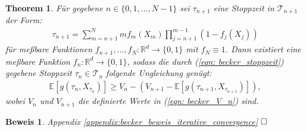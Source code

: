 \documentclass[12pt,titlepage,headsepline]{article}
\newtheorem{theorem}{Theorem}[section]
\newtheorem*{beweis-non}{Beweis}
\begin{document}
      \begin{theorem}\label{theorem: becker_stoppzeit_opt}
        Für gegebene $n \in \{0,1,\ldots,N-1\}$ sei $\tau_{n+1}$ eine Stoppzeit in $\mathcal{T}_{n+1}$ der Form:
        \begin{align*}
          \tau_{n+1} = \sum_{m={n+1}}^N mf_m(X_m)\prod_{j={n+1}}^{m-1}(1-f_j(X_j))
        \end{align*}
        für meßbare Funktionen $f_{n+1},\ldots,f_N:\mathbb{R}^d \rightarrow \{0,1\}$ mit $f_N \equiv 1$. Dann existiert eine meßbare Funktion $f_n: \mathbb{R}^d \rightarrow \{0,1\}$, sodass die durch (\ref{eqn: becker_stoppzeit}) gegebene Stoppzeit $\tau_n \in \mathcal{T}_n$ folgende Ungleichung genügt:
        \begin{align*}
          \mathbb{E}[g(\tau_n,X_{\tau_n})] \geq V_n - (V_{n+1} - \mathbb{E}[g(\tau_{n+1},X_{\tau_{n+1}})]),
        \end{align*}
        wobei $V_n$ und $V_{n+1}$ die definierte Werte in (\ref{eqn: becker_V_n}) sind.
      \end{theorem}
      \begin{beweis-non}
        Appendix \ref{appendix:becker_beweis_iterative_convergence}
        $\hfill\Box$
      \end{beweis-non}
\end{document}
